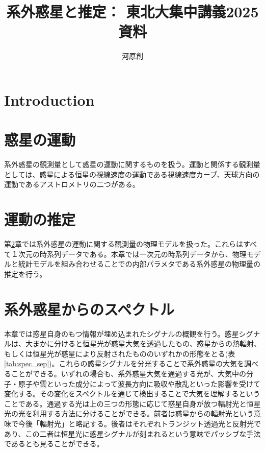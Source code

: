 \documentclass[xelatex,a4paper, twocolumn]{bxjsreport}
\begin{document}
\title{系外惑星と推定： 東北大集中講義2025資料}
\author{河原創}
\maketitle

\tableofcontents

\chapter{Introduction}




\chapter{惑星の運動}\label{ch:motion}
系外惑星の観測量として惑星の運動に関するものを扱う。運動と関係する観測量としては、惑星による恒星の視線速度の運動である視線速度カーブ、天球方向の運動であるアストロメトリの二つがある。




\chapter{運動の推定}\label{ch:infer}

第\ref{ch:motion}章では系外惑星の運動に関する観測量の物理モデルを扱った。これらはすべて１次元の時系列データである。本章では一次元の時系列データから、物理モデルと統計モデルを組み合わせることでの内部パラメタである系外惑星の物理量の推定を行う。





\chapter{系外惑星からのスペクトル}



本章では惑星自身のもつ情報が埋め込まれたシグナルの概観を行う。惑星シグナルは、大まかに分けると恒星光が惑星大気を透過したもの、惑星からの熱輻射、もしくは恒星光が惑星により反射されたもののいずれかの形態をとる(表\ref{tab:spec_sep})。これらの惑星シグナルを分光することで系外惑星の大気を調べることができる。いずれの場合も、系外惑星大気を通過する光が、大気中の分子・原子や雲といった成分によって波長方向に吸収や散乱といった影響を受けて変化する。その変化をスペクトルを通じて検出することで大気を理解するということである。通過する光は上の三つの形態に応じて惑星自身が放つ輻射光と恒星光の光を利用する方法に分けることができる。前者は惑星からの輻射光という意味で今後「輻射光」と略記する。後者はそれぞれトランジット透過光と反射光であり、この二者は恒星光に惑星シグナルが刻まれるという意味でパッシブな手法であるとも見ることができる。
\end{document}
